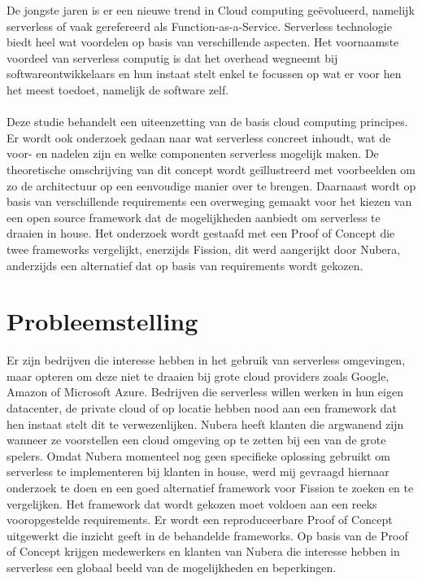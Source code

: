 De jongste jaren is er een nieuwe trend in Cloud computing geëvolueerd, namelijk serverless of vaak gerefereerd als Function-as-a-Service. Serverless technologie biedt heel wat voordelen op basis van verschillende aspecten. Het voornaamste voordeel van serverless computig is dat het overhead wegneemt bij softwareontwikkelaars en hun instaat stelt enkel te focussen op wat er voor hen het meest toedoet, namelijk de software zelf.
\\\\
Deze studie behandelt een uiteenzetting van de basis cloud computing principes. Er wordt ook onderzoek gedaan naar wat serverless concreet inhoudt, wat de voor- en nadelen zijn en welke componenten serverless mogelijk maken. De theoretische omschrijving van dit concept wordt geïllustreerd met voorbeelden om zo de architectuur op een eenvoudige manier over te brengen. Daarnaast wordt op basis van verschillende requirements een overweging gemaakt voor het kiezen van een open source framework dat de mogelijkheden aanbiedt om serverless te draaien in house. Het onderzoek wordt gestaafd met een Proof of Concept die twee frameworks vergelijkt, enerzijds Fission, dit werd aangerijkt door Nubera, anderzijds een alternatief dat op basis van requirements wordt gekozen.

\section{Probleemstelling}
\label{sec:probleemstelling}

Er zijn bedrijven die interesse hebben in het gebruik van serverless omgevingen, maar opteren om deze niet te draaien bij grote cloud providers zoals Google, Amazon of Microsoft Azure. Bedrijven die serverless willen werken in hun eigen datacenter, de private cloud of op locatie hebben nood aan een framework dat hen instaat stelt dit te verwezenlijken. Nubera heeft klanten die argwanend zijn wanneer ze voorstellen een cloud omgeving op te zetten bij een van de grote spelers. Omdat Nubera momenteel nog geen specifieke oplossing gebruikt om serverless te implementeren bij klanten in house, werd mij gevraagd hiernaar onderzoek te doen en een goed alternatief framework voor Fission te zoeken en te vergelijken. Het framework dat wordt gekozen moet voldoen aan een reeks vooropgestelde requirements. Er wordt een reproduceerbare Proof of Concept uitgewerkt die inzicht geeft in de behandelde frameworks. Op basis van de Proof of Concept krijgen medewerkers en klanten van Nubera die interesse hebben in serverless een globaal beeld van de mogelijkheden en beperkingen.

